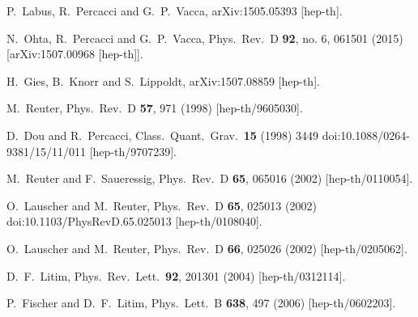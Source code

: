 \documentclass[twocolumn,prd,superscriptaddress,preprintnumbers,amsmath,amssymb,nofootinbib]{revtex4}
\begin{document}
\begin{thebibliography}{99}
  P.~Labus, R.~Percacci and G.~P.~Vacca,
  arXiv:1505.05393 [hep-th].
  
  N.~Ohta, R.~Percacci and G.~P.~Vacca,
  Phys.\ Rev.\ D {\bf 92}, no. 6, 061501 (2015)
  [arXiv:1507.00968 [hep-th]].
  
  H.~Gies, B.~Knorr and S.~Lippoldt,
  arXiv:1507.08859 [hep-th].
  
%
  M.~Reuter,
  Phys.\ Rev.\ D {\bf 57}, 971 (1998)
  [hep-th/9605030].

  D.~Dou and R.~Percacci,
  Class.\ Quant.\ Grav.\  {\bf 15} (1998) 3449
  doi:10.1088/0264-9381/15/11/011
  [hep-th/9707239].
  
  M.~Reuter and F.~Saueressig,
  Phys.\ Rev.\ D {\bf 65}, 065016 (2002)
  [hep-th/0110054].
  
  O.~Lauscher and M.~Reuter,
  Phys.\ Rev.\ D {\bf 65}, 025013 (2002)
  doi:10.1103/PhysRevD.65.025013
  [hep-th/0108040].
  

  O.~Lauscher and M.~Reuter,
  Phys.\ Rev.\ D {\bf 66}, 025026 (2002)
  [hep-th/0205062].

  D.~F.~Litim,
  Phys.\ Rev.\ Lett.\  {\bf 92}, 201301 (2004)
  [hep-th/0312114].

  P.~Fischer and D.~F.~Litim,
  Phys.\ Lett.\ B {\bf 638}, 497 (2006)
  [hep-th/0602203].


\end{thebibliography}
\end{document}
